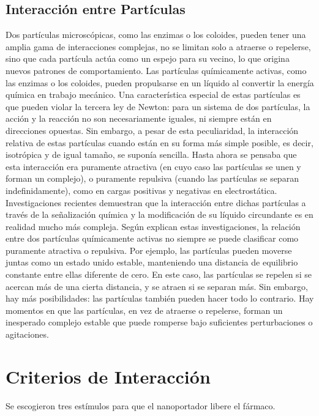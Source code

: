 \documentclass[a4paper,fleqn]{cas-sc}
\begin{document}
\subsection{Interacción entre Partículas}
Dos partículas microscópicas, como las enzimas o los coloides, pueden tener una amplia gama de interacciones complejas, no se limitan solo a atraerse o repelerse, sino que cada partícula actúa como un espejo para su vecino, lo que origina nuevos patrones de comportamiento. Las partículas químicamente activas, como las enzimas o los coloides, pueden propulsarse en un líquido al convertir la energía química en trabajo mecánico. Una característica especial de estas partículas es que pueden violar la tercera ley de Newton: para un sistema de dos partículas, la acción y la reacción no son necesariamente iguales, ni siempre están en direcciones opuestas.
Sin embargo, a pesar de esta peculiaridad, la interacción relativa de estas partículas cuando están en su forma más simple posible, es decir, isotrópica y de igual tamaño, se suponía sencilla. Hasta ahora se pensaba que esta interacción era puramente atractiva (en cuyo caso las partículas se unen y forman un complejo), o puramente repulsiva (cuando las partículas se separan indefinidamente), como en cargas positivas y negativas en electrostática. Investigaciones recientes demuestran que la interacción entre dichas partículas a través de la señalización química y la modificación de su líquido circundante es en realidad mucho más compleja.
Según explican estas investigaciones, la relación entre dos partículas químicamente activas no siempre se puede clasificar como puramente atractiva o repulsiva. Por ejemplo, las partículas pueden moverse juntas como un estado unido estable, manteniendo una distancia de equilibrio constante entre ellas diferente de cero. En este caso, las partículas se repelen si se acercan más de una cierta distancia, y se atraen si se separan más.
Sin embargo, hay más posibilidades: las partículas también pueden hacer todo lo contrario.
Hay momentos en que las partículas, en vez de atraerse o repelerse, forman un inesperado complejo estable que puede romperse bajo suficientes perturbaciones o agitaciones.






\section{Criterios de Interacción}
Se escogieron tres estímulos para que el nanoportador libere el fármaco.
\end{document}
